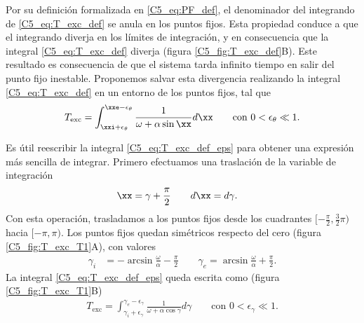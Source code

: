 {Por su definición formalizada en \ref{C5_eq:PF_def}, el denominador del integrando de \ref{C5_eq:T_exc_def} se anula en los puntos fijos. Esta propiedad conduce a que el integrando diverja en los límites de integración, y en consecuencia que la integral \ref{C5_eq:T_exc_def} diverja (figura \ref{C5_fig:T_exc_def}B). Este resultado es consecuencia de que el sistema tarda infinito tiempo en salir del punto fijo inestable. Proponemos salvar esta divergencia realizando la integral \ref{C5_eq:T_exc_def} en un entorno de los puntos fijos, tal que
\begin{align}
    T_{\text{exc}} = \int_{\xxi+\epsilon_\theta}^{\xxe-\epsilon_\theta}  \frac{1}{\omega + \alpha \sin{\xx}} d\xx \qquad \text{con } 0<\epsilon_\theta \ll 1.
    \label{C5_eq:T_exc_def_eps}
\end{align}


Es útil reescribir la integral \ref{C5_eq:T_exc_def_eps} para obtener una expresión más sencilla de integrar. Primero efectuamos una traslación de la variable de integración \xx
\begin{align}
    \xx &= \gamma + \frac{\pi}{2} \qquad 
    d\xx = d\gamma. 
\end{align}
Con esta operación, trasladamos a los puntos fijos desde los cuadrantes $[-\frac{\pi}{2},\frac{3}{2} \pi)$ hacia $[-\pi, \pi)$. Los puntos fijos quedan simétricos respecto del cero (figura \ref{C5_fig:T_exc_T1}A), con valores
\begin{align}
    \gamma_i &= -\arcsin{\frac{\omega}{\alpha}} - \frac{\pi}{2} \qquad
    \gamma_e = \arcsin{\frac{\omega}{\alpha}} + \frac{\pi}{2}.
\end{align}
La integral \ref{C5_eq:T_exc_def_eps} queda escrita como (figura \ref{C5_fig:T_exc_T1}B)
\begin{align}
    T_{\text{exc}} = \int_{\gamma_i+\epsilon_\gamma}^{\gamma_e-\epsilon_\gamma}  \frac{1}{\omega + \alpha \cos{\gamma}} d\gamma \qquad \text{con } 0 < \epsilon_\gamma \ll 1.
    \label{C5_eq:T_exc_def_T1}
\end{align}

}
